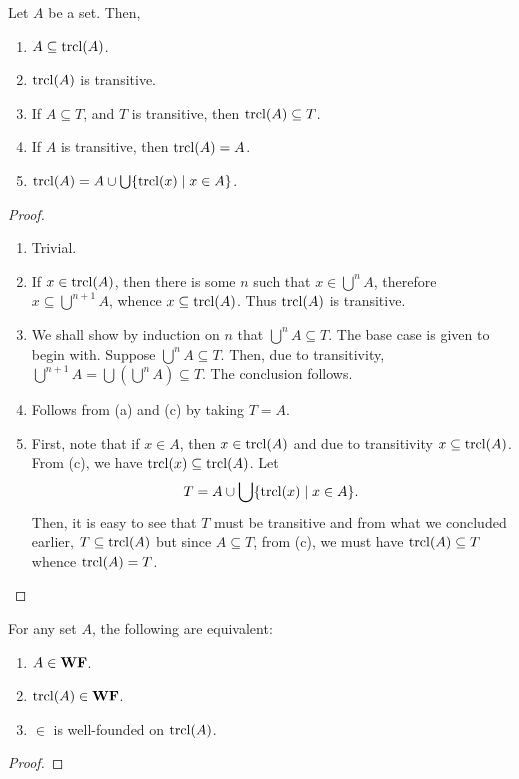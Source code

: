 \begin{lemma}
    Let $A$ be a set. Then, 
    \begin{enumerate}[label=(\alph*)]
        \item $A\subseteq\operatorname{tr cl}(A)$.
        \item $\operatorname{tr cl}(A)$ is transitive. 
        \item If $A\subseteq T$, and $T$ is transitive, then $\operatorname{tr cl}(A)\subseteq T$. 
        \item If $A$ is transitive, then $\operatorname{tr cl}(A) = A$. 
        \item $\operatorname{tr cl}(A) = A\cup\bigcup\{\operatorname{tr cl}(x)\mid x\in A\}$.
    \end{enumerate}
\end{lemma}
\begin{proof}
\begin{enumerate}[label=(\alph*)]
    \item Trivial. 
    \item If $x\in\operatorname{tr cl}(A)$, then there is some $n$ such that $x\in\bigcup^n A$, therefore $x\subseteq\bigcup^{n + 1}A$, whence $x\subseteq\operatorname{tr cl}(A)$. Thus $\operatorname{tr cl}(A)$ is transitive.
    \item We shall show by induction on $n$ that $\bigcup^n A\subseteq T$. The base case is given to begin with. Suppose $\bigcup^n A\subseteq T$. Then, due to transitivity, $\bigcup^{n + 1}A = \bigcup\left(\bigcup^n A\right)\subseteq T$. The conclusion follows.
    \item Follows from (a) and (c) by taking $T = A$.
    \item First, note that if $x\in A$, then $x\in\operatorname{tr cl}(A)$ and due to transitivity $x\subseteq\operatorname{tr cl}(A)$. From (c), we have $\operatorname{tr cl}(x)\subseteq\operatorname{tr cl}(A)$. Let 
    \begin{equation*}
        T = A \cup\bigcup\{\operatorname{tr cl}(x)\mid x\in A\}.
    \end{equation*}
    Then, it is easy to see that $T$ must be transitive and from what we concluded earlier, $T\subseteq\operatorname{tr cl}(A)$ but since $A\subseteq T$, from (c), we must have $\operatorname{tr cl}(A)\subseteq T$ whence $\operatorname{tr cl}(A) = T$.\qedhere
\end{enumerate}
\end{proof}

\begin{theorem}
    For any set $A$, the following are equivalent: 
    \begin{enumerate}[label=(\alph*)]
        \item $A\in\mathbf{WF}$.
        \item $\operatorname{tr cl}(A)\in\mathbf{WF}$.
        \item $\in$ is well-founded on $\operatorname{tr cl}(A)$.
    \end{enumerate}
\end{theorem}
\begin{proof}
    
\end{proof}

